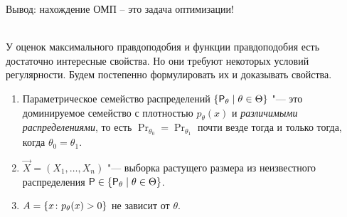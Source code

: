 Вывод: нахождение ОМП -- это задача оптимизации!\\\

У оценок максимального правдоподобия и функции правдоподобия есть достаточно интересные свойства. Но они требуют некоторых условий регулярности. Будем постепенно формулировать их и доказывать свойства.
\begin{enumerate}[label=(R\arabic*)]
    \item Параметрическое семейство распределений $\left\{\mathsf{P}_{\theta} \mid \theta \in \Theta\right\}$ "--- это доминируемое семейство с плотностью $p_{\theta}(x)$ и \emph{различимыми распределениями}, то есть $\Pr_{\theta_{0}} = \Pr_{\theta_{1}}$ почти везде тогда и только тогда, когда $\theta_{0} = \theta_{1}$.
    
    \item $\vec{X} = (X_{1}, \ldots, X_{n})$ "--- выборка растущего размера из неизвестного распределения $\mathsf{P} \in \left\{\mathsf{P}_{\theta} \mid \theta \in \Theta\right\}$.
    
    \item $A = \left\{x \colon p_{\theta}(x) > 0\right\}$ не зависит от $\theta$.
\end{enumerate}


